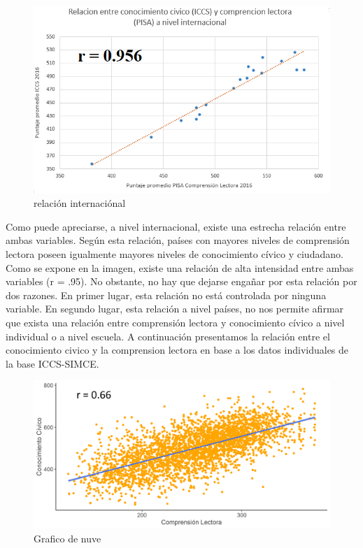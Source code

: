 \documentclass[12pt,twoside]{templates/facsothesis}
\begin{document}
\begin{figure}

{\centering \includegraphics[width=0.8\linewidth]{images/relacionmacro} 

}

\caption{relación internaciónal}\label{fig:unnamed-chunk-8}
\end{figure}

Como puede apreciarse, a nivel internacional, existe una estrecha relación entre ambas variables. Según esta relación, países con mayores niveles de comprensión lectora poseen igualmente mayores niveles de conocimiento cívico y ciudadano. Como se expone en la imagen, existe una relación de alta intensidad entre ambas variables (r = .95). No obstante, no hay que dejarse engañar por esta relación por dos razones. En primer lugar, esta relación no está controlada por ninguna variable. En segundo lugar, esta relación a nivel países, no nos permite afirmar que exista una relación entre comprensión lectora y conocimiento cívico a nivel individual o a nivel escuela. A continuación presentamos la relación entre el conocimiento civico y la comprension lectora en base a los datos individuales de la base ICCS-SIMCE.

\begin{figure}

{\centering \includegraphics[width=0.8\linewidth]{images/scater} 

}

\caption{Grafico de nuve}\label{fig:unnamed-chunk-9}
\end{figure}
\end{document}
